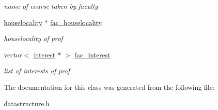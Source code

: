 \begin{DoxyCompactItemize}
\begin{DoxyCompactList}\small\item\em name of course taken by faculty \end{DoxyCompactList}\item 
\hypertarget{classfaculty_aa9fa766a91a21cd7f68abd4e18d5546b}{\hyperlink{classhouselocality}{houselocality} $\ast$ \hyperlink{classfaculty_aa9fa766a91a21cd7f68abd4e18d5546b}{fac\-\_\-houselocality}}\label{classfaculty_aa9fa766a91a21cd7f68abd4e18d5546b}

\begin{DoxyCompactList}\small\item\em houselocality of prof \end{DoxyCompactList}\item 
\hypertarget{classfaculty_ac88dd9f824a11c0235dd6650ee441705}{vector$<$ \hyperlink{classinterest}{interest} $\ast$ $>$ \hyperlink{classfaculty_ac88dd9f824a11c0235dd6650ee441705}{fac\-\_\-interest}}\label{classfaculty_ac88dd9f824a11c0235dd6650ee441705}

\begin{DoxyCompactList}\small\item\em list of interests of prof \end{DoxyCompactList}\end{DoxyCompactItemize}


\-The documentation for this class was generated from the following file\-:\begin{DoxyCompactItemize}
\item 
datastructure.\-h\end{DoxyCompactItemize}
